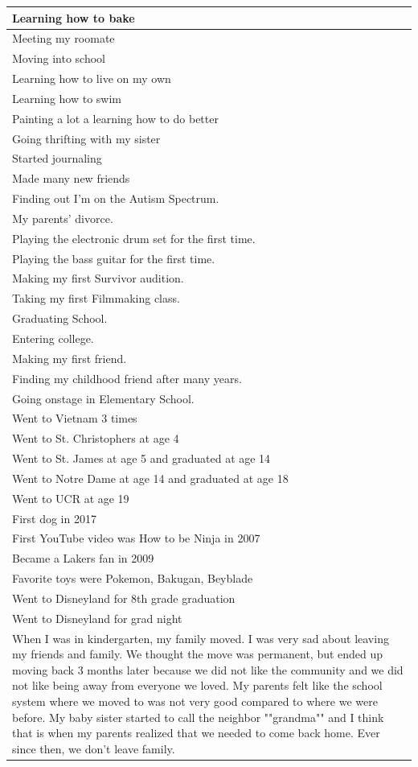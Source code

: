 \documentclass[
  .7em,
  letterpaper,
  DIV=11,
  numbers=noendperiod]{scrartcl}
\begin{document}
\begin{table}
\begin{tabular}{l}
Learning how to bake\\
\hline
Meeting my roomate\\
\hline
Moving into school\\
\hline
Learning how to live on my own\\
\hline
Learning how to swim\\
\hline
Painting a lot a learning how to do better\\
\hline
Going thrifting with my sister\\
\hline
Started journaling\\
\hline
Made many new friends\\
\hline
Finding out I'm on the Autism Spectrum.\\
\hline
My parents' divorce.\\
\hline
Playing the electronic drum set for the first time.\\
\hline
Playing the bass guitar for the first time.\\
\hline
Making my first Survivor audition.\\
\hline
Taking my first Filmmaking class.\\
\hline
Graduating School.\\
\hline
Entering college.\\
\hline
Making my first friend.\\
\hline
Finding my childhood friend after many years.\\
\hline
Going onstage in Elementary School.\\
\hline
Went to Vietnam 3 times\\
\hline
Went to St. Christophers at age 4\\
\hline
Went to St. James at age 5 and graduated at age 14\\
\hline
Went to Notre Dame at age 14 and graduated at age 18\\
\hline
Went to UCR at age 19\\
\hline
First dog in 2017\\
\hline
First YouTube video was How to be Ninja in 2007\\
\hline
Became a Lakers fan in 2009\\
\hline
Favorite toys were Pokemon, Bakugan, Beyblade\\
\hline
Went to Disneyland for 8th grade graduation\\
\hline
Went to Disneyland for grad night\\
\hline
When I was in kindergarten, my family moved. I was very sad about leaving my friends and family. We thought the move was permanent, but ended up moving back 3 months later because we did not like the community and we did not like being away from everyone we loved. My parents felt like the school system where we moved to was not very good compared to where we were before. My baby sister started to call the neighbor ""grandma"" and I think that is when my parents realized that we needed to come back home. Ever since then, we don't leave family.\\

\end{tabular}
\end{table}
\end{document}
